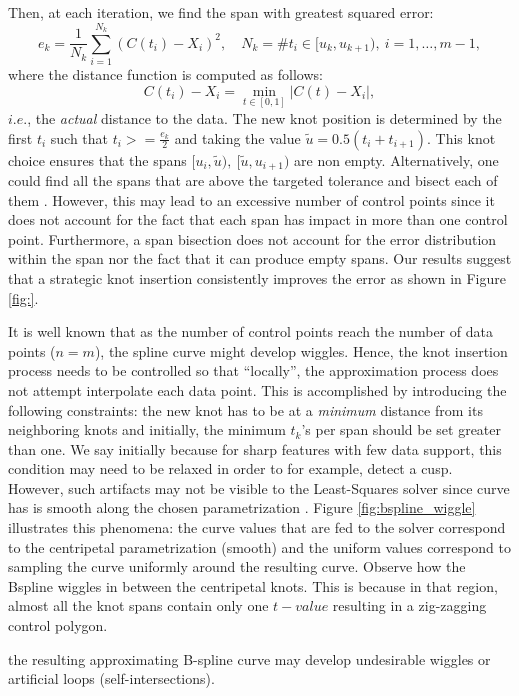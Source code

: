  Then, at each iteration, we find the span with greatest squared error: 
 $$e_k = \frac{1}{N_k}\sum_{i=1}^{N_k} (C(t_i) - X_i)^2,\quad N_k = \# t_i\in [u_k, u_{k+1}),\ i=1,\ldots,m-1, $$
 where the distance function is computed as follows:
 \begin{equation}
  C(t_i) - X_i = \min_{t\in[0,1]} |C(t) -  X_i|,
 \end{equation}
$i.e.$, the \emph{actual} distance to the data. The new knot position is determined by
 the first $t_i$ such that $t_i >= \frac{e_k}{2}$ and taking
 the value $\tilde u = 0.5(t_i+t_{i+1})$. This knot choice ensures that the spans $[u_i, \tilde u),\ [\tilde u,u_{i+1})$ are non empty. 
Alternatively, one could find all the spans that are 
above the targeted tolerance and bisect each of them \cite[Ch. ]{nurbs_book}. 
 However, this may lead to an excessive number of control points since it does not account  
 for the fact that each span has impact in more than one control point. 
Furthermore, a span bisection does not account for the error distribution within the span nor 
the fact that it can produce empty spans. Our results suggest that a strategic knot insertion consistently improves the error as shown in Figure \ref{fig:}. 

It is well known that as the number of control points reach the number of data points ($n=m$), the spline curve might develop wiggles. 
Hence, the knot insertion process needs to be controlled so that ``locally'', the approximation process does not attempt interpolate each data point. 
This is accomplished by introducing the following constraints: the new knot has to be at a \emph{minimum} distance from its neighboring knots and initially, 
the minimum $t_k$'s per span should be set greater than one. We say initially because for sharp features with few data support, this condition may need to be relaxed in order 
to for example, detect a cusp.
 However, such artifacts may not be visible to the Least-Squares solver since curve has is smooth along the chosen parametrization 
. Figure \ref{fig:bspline_wiggle} illustrates this phenomena: the curve values that 
 are fed to the solver correspond to the centripetal parametrization (smooth) and the uniform values correspond to 
 sampling the curve uniformly around the resulting curve. 
 Observe how the Bspline wiggles in between the centripetal knots. This is because in that region, almost all the 
 knot spans contain only one $t-value$ resulting in a zig-zagging control polygon.


the resulting approximating B-spline curve may develop undesirable wiggles or artificial loops (self-intersections). 
 

